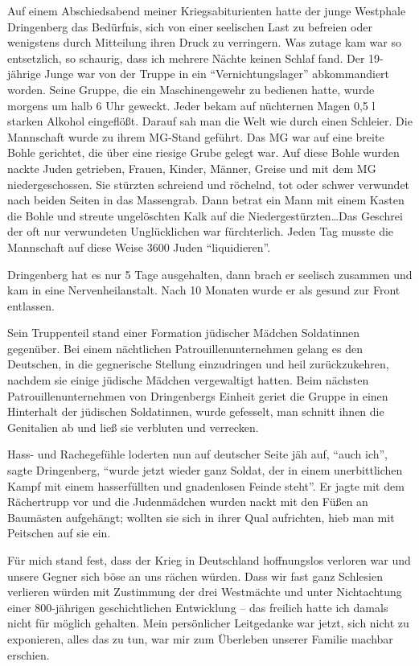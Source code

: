 Auf einem Abschiedsabend meiner Kriegsabiturienten hatte der junge Westphale Dringenberg das Bedürfnis, sich von einer seelischen Last zu befreien oder wenigstens durch Mitteilung ihren Druck zu verringern. Was zutage kam war so entsetzlich, so schaurig, dass ich mehrere Nächte keinen Schlaf fand. Der 19-jährige Junge war von der Truppe in ein \enquote{Vernichtungslager} abkommandiert worden. Seine Gruppe, die ein Maschinengewehr zu bedienen hatte, wurde morgens um halb 6 Uhr geweckt. Jeder bekam auf nüchternen Magen 0,5 l starken Alkohol eingeflößt. Darauf sah man die Welt wie durch einen Schleier.  Die Mannschaft wurde zu ihrem MG-Stand geführt. Das MG war auf eine breite Bohle gerichtet, die über eine riesige Grube gelegt war. Auf diese Bohle wurden nackte Juden getrieben, Frauen, Kinder, Männer, Greise und mit dem MG niedergeschossen. Sie stürzten schreiend und röchelnd, tot oder schwer verwundet nach beiden Seiten in das Massengrab. Dann betrat ein Mann mit einem Kasten die Bohle und streute ungelöschten Kalk auf die Niedergestürzten\dots Das Geschrei der oft nur verwundeten Unglücklichen war fürchterlich. Jeden Tag musste die Mannschaft auf diese Weise \num{3600} Juden \enquote{liquidieren}.

Dringenberg hat es nur 5 Tage ausgehalten, dann brach er seelisch zusammen und kam in eine Nervenheilanstalt. Nach 10 Monaten wurde er als gesund zur Front entlassen.

 Sein Truppenteil stand einer Formation jüdischer Mädchen Soldatinnen gegenüber. Bei einem nächtlichen Patrouillenunternehmen gelang es den Deutschen, in die gegnerische Stellung einzudringen und heil zurückzukehren, nachdem sie einige jüdische Mädchen vergewaltigt hatten. Beim nächsten Patrouillenunternehmen von Dringenbergs Einheit geriet die Gruppe in einen Hinterhalt der jüdischen Soldatinnen, wurde gefesselt, man schnitt ihnen die Genitalien ab und ließ sie verbluten und verrecken.

Hass- und Rachegefühle loderten nun auf deutscher Seite jäh auf, \enquote{auch ich}, sagte Dringenberg, \enquote{wurde jetzt wieder ganz Soldat, der in einem unerbittlichen Kampf mit einem hasserfüllten und gnadenlosen Feinde steht}. Er jagte mit dem Rächertrupp vor und die Judenmädchen wurden nackt mit den Füßen an Baumästen aufgehängt; wollten sie sich in ihrer Qual aufrichten, hieb man mit Peitschen auf sie ein.

 Für mich stand fest, dass der Krieg in Deutschland hoffnungslos verloren war und unsere Gegner sich böse an uns rächen würden. Dass wir fast ganz Schlesien verlieren würden mit Zustimmung der drei Westmächte und unter Nichtachtung einer 800-jährigen geschichtlichen Entwicklung -- das freilich hatte ich damals nicht für möglich gehalten. Mein persönlicher Leitgedanke war jetzt, sich nicht zu exponieren, alles das zu tun, war mir zum Überleben unserer Familie machbar erschien.

